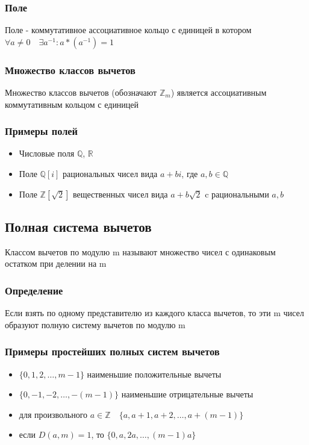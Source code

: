 \documentclass[12pt]{article}
\begin{document}
\subsubsection{Поле}
Поле - коммутативное ассоциативное кольцо с единицей в котором $\forall a \ne 0 \quad \exists a^{-1}: a * (a^{-1}) = 1$

\subsubsection{Множество классов вычетов}
Множество классов вычетов (обозначают $\mathbb{Z}_m$) является ассоциативным коммутативным кольцом с единицей
\subsubsection{Примеры полей}
\begin{itemize}
    \item Числовые поля $\mathbb{Q}$, $\mathbb{R}$
    \item Поле $\mathbb{Q}[i]$ рациональных чисел вида $a + bi$, где $a,b \in \mathbb{Q}$
    \item Поле $\mathbb{Z}[\sqrt{2}]$ вещественных чисел вида $a + b\sqrt{2}$ c рациональными $a,b$
\end{itemize}

\subsection{Полная система вычетов}

Классом вычетов по модулю m называют множество чисел с одинаковым остатком при делении на m
\subsubsection{Определение}
Если взять по одному представителю из каждого класса вычетов, то эти m чисел образуют полную систему вычетов по модулю m

\subsubsection{Примеры простейших полных систем вычетов}
\begin{itemize}
    \item $\{0, 1, 2, \dots, m-1\}$ наименьшие положительные вычеты
    \item $\{0, -1, -2, \dots, -(m-1)\}$ наименьшие отрицательные вычеты
    \item для произвольного $a \in \mathbb{Z} \quad\{a, a+1, a+2, \dots, a+(m-1)\}$
    \item если $D(a,m) = 1$, то $\{0, a, 2a, \dots, (m-1)a\}$
\end{itemize}
\end{document}
